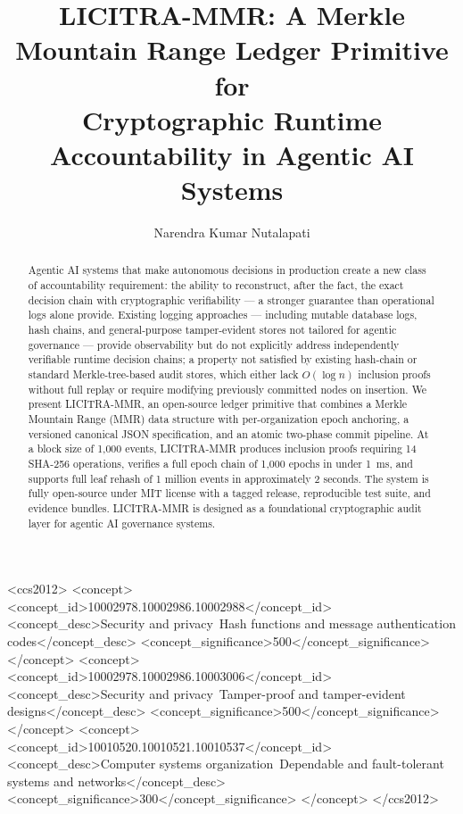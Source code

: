 \documentclass[sigconf,natbib=false]{acmart}
\begin{document}
\sloppy

\title{LICITRA-MMR: A Merkle Mountain Range Ledger Primitive for\\
Cryptographic Runtime Accountability in Agentic AI Systems}

\author{Narendra Kumar Nutalapati}

\begin{abstract}
Agentic AI systems that make autonomous decisions in production create a
new class of accountability requirement: the ability to reconstruct, after
the fact, the exact decision chain with cryptographic verifiability --- a
stronger guarantee than operational logs alone provide. Existing logging
approaches --- including mutable database logs, hash chains, and
general-purpose tamper-evident stores not tailored for agentic governance
--- provide observability but do not explicitly address independently
verifiable runtime decision chains; a property not satisfied by existing
hash-chain or standard Merkle-tree-based audit stores, which either lack
$O(\log n)$ inclusion proofs without full replay or require modifying
previously committed nodes on insertion. We present LICITRA-MMR, an open-source
ledger primitive that combines a Merkle Mountain Range (MMR) data structure
with per-organization epoch anchoring, a versioned canonical JSON
specification, and an atomic two-phase commit pipeline. At a block size of
1,000 events, LICITRA-MMR produces inclusion proofs requiring 14 SHA-256
operations, verifies a full epoch chain of 1,000 epochs in under 1~ms, and
supports full leaf rehash of 1 million events in approximately 2 seconds.
The system is fully open-source under MIT license with a tagged release,
reproducible test suite, and evidence bundles. LICITRA-MMR is designed as
a foundational cryptographic audit layer for agentic AI governance systems.
\end{abstract}



\begin{CCSXML}
<ccs2012>
<concept>
<concept_id>10002978.10002986.10002988</concept_id>
<concept_desc>Security and privacy~Hash functions and message authentication codes</concept_desc>
<concept_significance>500</concept_significance>
</concept>
<concept>
<concept_id>10002978.10002986.10003006</concept_id>
<concept_desc>Security and privacy~Tamper-proof and tamper-evident designs</concept_desc>
<concept_significance>500</concept_significance>
</concept>
<concept>
<concept_id>10010520.10010521.10010537</concept_id>
<concept_desc>Computer systems organization~Dependable and fault-tolerant systems and networks</concept_desc>
<concept_significance>300</concept_significance>
</concept>
</ccs2012>
\end{CCSXML}
\end{document}
